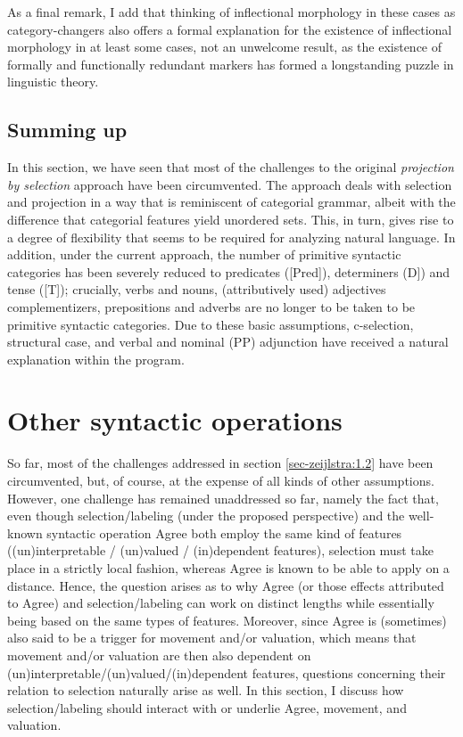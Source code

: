 \documentclass[output=paper
,modfonts
,nonflat]{langsci/langscibook}
\begin{document}
As a final remark, I add that thinking of inflectional morphology in these cases as category-changers also offers a formal explanation for the existence of inflectional morphology in at least some cases, not an unwelcome result, as the existence of formally and functionally redundant markers has formed a longstanding puzzle in linguistic theory.

\subsection{Summing up}
In this section, we have seen that most of the challenges to the original \textit{projection by selection} approach have been circumvented. The approach deals with selection and projection in a way that is reminiscent of categorial grammar, albeit with the difference that categorial features yield unordered sets. This, in turn, gives rise to a degree of flexibility that seems to be required for analyzing natural language. In addition, under the current approach, the number of primitive syntactic categories has been severely reduced to predicates ([Pred]), determiners (D]) and tense ([T]); crucially, verbs and nouns, (attributively used) adjectives complementizers, prepositions and adverbs are no longer to be taken to be primitive syntactic categories. Due to these basic assumptions, c-selection, structural case, and verbal and nominal (PP) adjunction have received a natural explanation within the program.

\section{Other syntactic operations}
So far, most of the challenges addressed in section \ref{sec-zeijlstra:1.2} have been circumvented, but, of course, at the expense of all kinds of other assumptions. However, one challenge has remained unaddressed so far, namely the fact that, even though selection/labeling (under the proposed perspective) and the well-known syntactic operation Agree both employ the same kind of features ((un)interpretable / (un)valued / (in)dependent features), selection must take place in a strictly local fashion, whereas Agree is known to be able to apply on a distance. Hence, the question arises as to why Agree (or those effects attributed to Agree) and selection/labeling can work on distinct lengths while essentially being based on the same types of features. Moreover, since Agree is (sometimes) also said to be a trigger for movement and/or valuation, which means that movement and/or valuation are then also dependent on (un)interpretable/(un)valued/(in)dependent features, questions concerning their relation to selection naturally arise as well. In this section, I discuss how selection/labeling should interact with or underlie Agree, movement, and valuation.
\end{document}
